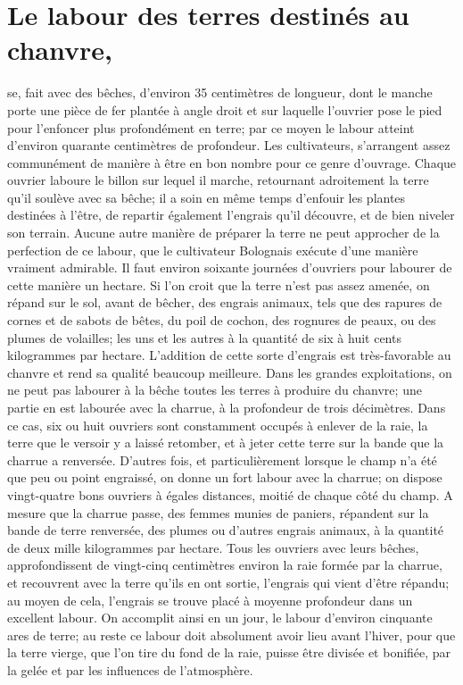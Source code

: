 \section{Le labour des terres destinés au chanvre,}\setcounter{page}{168} se, fait avec des bêches, d'environ 35 centimètres de longueur, dont le manche porte une pièce de fer plantée à angle droit et sur laquelle l'ouvrier pose le pied pour l'enfoncer plus profondément en terre; par ce moyen le labour atteint d'environ quarante centimètres de profondeur. Les cultivateurs, s'arrangent assez communément de manière à être en bon nombre pour ce genre d'ouvrage. Chaque ouvrier laboure le billon sur lequel il marche, retournant adroitement la terre qu'il soulève avec sa bêche; il a soin en même temps d'enfouir les plantes destinées à l'être, de repartir également l'engrais qu'il découvre, et de bien niveler son terrain. Aucune autre manière de préparer la terre ne peut approcher de la perfection de ce labour, que le cultivateur Bolognais exécute d'une manière vraiment admirable.
Il faut environ soixante journées d'ouvriers pour labourer de cette manière un hectare. Si l'on croit que la terre n'est pas assez amenée, on répand sur le sol, avant de bêcher, des engrais animaux, tels que des rapures de cornes et de sabots de bêtes, du poil de cochon, des rognures de peaux, ou des plumes de volailles; les uns et les autres à la quantité de six à huit cents kilogrammes par hectare. L'addition de cette sorte\setcounter{page}{169} d'engrais est très-favorable au chanvre et rend sa qualité beaucoup meilleure.
Dans les grandes exploitations, on ne peut pas labourer à la bêche toutes les terres à produire du chanvre; une partie en est labourée avec la charrue, à la profondeur de trois décimètres. Dans ce cas, six ou huit ouvriers sont constamment occupés à enlever de la raie, la terre que le versoir y a laissé retomber, et à jeter cette terre sur la bande que la charrue a renversée. D'autres fois, et particulièrement lorsque le champ n'a été que peu ou point engraissé, on donne un fort labour avec la charrue; on dispose vingt-quatre bons ouvriers à égales distances, moitié de chaque côté du champ. A mesure que la charrue passe, des femmes munies de paniers, répandent sur la bande de terre renversée, des plumes ou d'autres engrais animaux, à la quantité de deux mille kilogrammes par hectare. Tous les ouvriers avec leurs bêches, approfondissent de vingt-cinq centimètres environ la raie formée par la charrue, et recouvrent avec la terre qu'ils en ont sortie, l'engrais qui vient d'être répandu; au moyen de cela, l'engrais se trouve placé à moyenne profondeur dans un excellent labour. On accomplit ainsi en un jour, le labour d'environ cinquante ares de\setcounter{page}{170} terre; au reste ce labour doit absolument avoir lieu avant l'hiver, pour que la terre vierge, que l'on tire du fond de la raie, puisse être divisée et bonifiée, par la gelée et par les influences de l'atmosphère.
